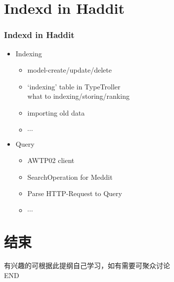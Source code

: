 \documentclass[unicode]{beamer}
\begin{document}
\begin{CJK}{UTF8}{gbsn}
  \section{Indexd in Haddit}
  \begin{frame}
    \frametitle{Indexd in Haddit}
    \begin{itemize}
    \item Indexing
      \begin{itemize}
      \item model-create/update/delete
      \item `indexing' table in TypeTroller \\
        {\tiny what to indexing/storing/ranking}
      \item importing old data
      \item $\cdots$
      \end{itemize}
      \vfill
    \item Query
      \begin{itemize}
      \item AWTP02 client
      \item SearchOperation for Meddit
      \item Parse HTTP-Request to Query
      \item $\cdots$
      \end{itemize}
    \end{itemize}
  \end{frame}

  \section{结束}
  \begin{frame}
    \begin{center}
      {\tiny 有兴趣的可根据此提纲自己学习，如有需要可聚众讨论}\\\vfill
      {\Huge END}
    \end{center}
  \end{frame}

\end{CJK}
\end{document}

